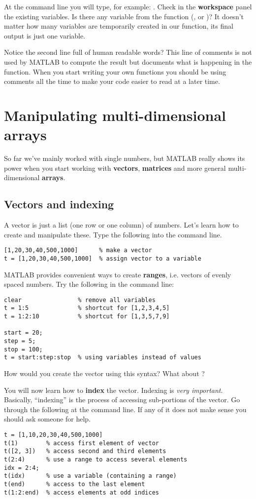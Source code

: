 \documentclass{article}
\begin{document}
At the command line you will type, for example: .
Check in the \textbf{workspace} panel the existing variables.
Is there any variable from the function (,  or )?
It doesn't matter how many variables are temporarily created in our function, its final output is just one variable.

Notice the second line full of human readable words?
This line of comments is not used by MATLAB to compute the result but documents what is happening in the function.
When you start writing your own functions you should be using comments all the time to make your code easier to read at a later time.


\section{Manipulating multi-dimensional arrays}

So far we've mainly worked with single numbers, but MATLAB really shows its power when you start working with \textbf{vectors}, \textbf{matrices} and more general multi-dimensional \textbf{arrays}.

\subsection{Vectors and indexing}

A vector is just a list (one row or one column) of numbers.
Let's learn how to create and manipulate these.
Type the following into the command line.
\begin{lstlisting}
[1,20,30,40,500,1000]      % make a vector
t = [1,20,30,40,500,1000]  % assign vector to a variable
\end{lstlisting}

MATLAB provides convenient ways to create \textbf{ranges}, i.e. vectors of evenly spaced numbers.
Try the following in the command line:
\begin{lstlisting}
clear                % remove all variables
t = 1:5              % shortcut for [1,2,3,4,5]
t = 1:2:10           % shortcut for [1,3,5,7,9]

start = 20;
step = 5;
stop = 100;
t = start:step:stop  % using variables instead of values
\end{lstlisting}
How would you create the vector \mcode{[5,8,11,14]} using this syntax? What about \mcode{[-1,-2,-3,-4]}?

You will now learn how to \textbf{index} the vector.
Indexing is \emph{very important}.
Basically, ``indexing'' is the process of accessing sub-portions of the vector.
Go through the following at the command line.
If any of it does not make sense you should ask someone for help.
\begin{lstlisting}
t = [1,10,20,30,40,500,1000]
t(1)        % access first element of vector
t([2, 3])   % access second and third elements
t(2:4)      % use a range to access several elements
idx = 2:4;
t(idx)      % use a variable (containing a range)
t(end)      % access to the last element
t(1:2:end)  % access elements at odd indices
\end{lstlisting}
\end{document}
